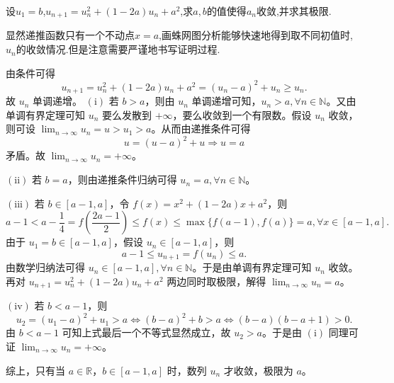 \documentclass[../../main.tex]{subfiles}%
\begin{document}
\begin{example}
设\(u_1 = b\),\(u_{n + 1}=u_{n}^{2}+(1 - 2a)u_{n}+a^{2}\),求$a,b$的值使得$a_n$收敛,并求其极限.
\end{example}
\begin{note}
显然递推函数只有一个不动点$x=a$,画蛛网图分析能够快速地得到取不同初值时,$u_n$的收敛情况.但是注意需要严谨地书写证明过程.
\end{note}
\begin{solution}
由条件可得
\[
u_{n + 1}=u_{n}^{2}+(1 - 2a)u_n + a^2=(u_n - a)^2 + u_n\geqslant u_n.
\]
故 \(u_n\) 单调递增。 
\((\mathrm{i})\) 若 \(b > a\)，则由 \(u_n\) 单调递增可知，\(u_n > a,\forall n\in \mathbb{N}\)。又由单调有界定理可知 \(u_n\) 要么发散到 \(+\infty\)，要么收敛到一个有限数。假设 \(u_n\) 收敛，则可设 \(\lim_{n\rightarrow \infty}u_n = u > u_1 > a\)。从而由递推条件可得
\[
u=(u - a)^2 + u\Rightarrow u = a
\]
矛盾。故 \(\lim_{n\rightarrow \infty}u_n = +\infty\)。

\((\mathrm{ii})\) 若 \(b = a\)，则由递推条件归纳可得 \(u_n = a,\forall n\in \mathbb{N}\)。

\((\mathrm{iii})\) 若 \(b\in [a - 1,a]\)，令 \(f(x)=x^2+(1 - 2a)x + a^2\)，则
\[
a - 1 < a - \frac{1}{4}=f\left(\frac{2a - 1}{2}\right)\leqslant f(x)\leqslant \max\{f(a - 1),f(a)\}=a,\forall x\in [a - 1,a].
\]
由于 \(u_1 = b\in [a - 1,a]\)，假设 \(u_n\in [a - 1,a]\)，则
\[
a - 1\leqslant u_{n + 1}=f(u_n)\leqslant a.
\]
由数学归纳法可得 \(u_n\in [a - 1,a],\forall n\in \mathbb{N}\)。于是由单调有界定理可知 \(u_n\) 收敛。再对 \(u_{n + 1}=u_{n}^{2}+(1 - 2a)u_n + a^2\) 两边同时取极限，解得 \(\lim_{n\rightarrow \infty}u_n = a\)。

\((\mathrm{iv})\) 若 \(b < a - 1\)，则
\[
u_2=(u_1 - a)^2 + u_1 > a\Leftrightarrow (b - a)^2 + b > a\Leftrightarrow (b - a)(b - a + 1) > 0.
\]
由 \(b < a - 1\) 可知上式最后一个不等式显然成立，故 \(u_2 > a\)。于是由 \((\mathrm{i})\) 同理可证 \(\lim_{n\rightarrow \infty}u_n = +\infty\)。

综上，只有当 \(a\in \mathbb{R}\)，\(b\in [a - 1,a]\) 时，数列 \(u_n\) 才收敛，极限为 \(a\)。

\end{solution}
\end{document}
